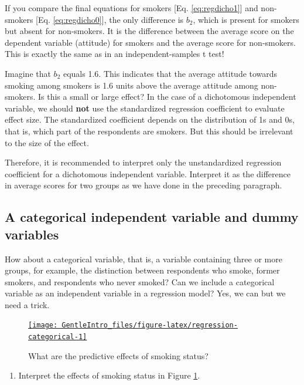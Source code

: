 \documentclass[a4paper]{book}
\providecommand{\tightlist}{%
  \setlength{\itemsep}{0pt}\setlength{\parskip}{0pt}}
\theoremstyle{definition}
\theoremstyle{definition}
\theoremstyle{definition}
\theoremstyle{remark}
\begin{document}
If you compare the final equations for smokers {[}Eq.
\eqref{eq:regdicho1}{]} and non-smokers {[}Eq. \eqref{eq:regdicho0}{]}, the
only difference is \(b_2\), which is present for smokers but absent for
non-smokers. It is the difference between the average score on the
dependent variable (attitude) for smokers and the average score for
non-smokers. This is exactly the same as in an independent-samples t
test!

Imagine that \(b_2\) equals 1.6. This indicates that the average
attitude towards smoking among smokers is 1.6 units above the average
attitude among non-smokers. Is this a small or large effect? In the case
of a dichotomous independent variable, we should \textbf{not} use the
standardized regression coefficient to evaluate effect size. The
standardized coefficient depends on the distribution of 1s and 0s, that
is, which part of the respondents are smokers. But this should be
irrelevant to the size of the effect.

Therefore, it is recommended to interpret only the unstandardized
regression coefficient for a dichotomous independent variable. Interpret
it as the difference in average scores for two groups as we have done in
the preceding paragraph.

\subsection{A categorical independent variable and dummy
variables}\label{categorical-predictor}

How about a categorical variable, that is, a variable containing three
or more groups, for example, the distinction between respondents who
smoke, former smokers, and respondents who never smoked? Can we include
a categorical variable as an independent variable in a regression model?
Yes, we can but we need a trick.

\begin{figure}[H]
\href{http://82.196.4.233:3838/apps/regression-categorical/}{\texttt{[image: GentleIntro\_files/figure-latex/regression-categorical-1]} }\caption{What are the predictive effects of smoking status?}\label{fig:regression-categorical}
\end{figure}

\begin{enumerate}
\def\labelenumi{\arabic{enumi}.}
\tightlist
\item
  Interpret the effects of smoking status in Figure
  \ref{fig:regression-categorical}.
\end{enumerate}
\end{document}
